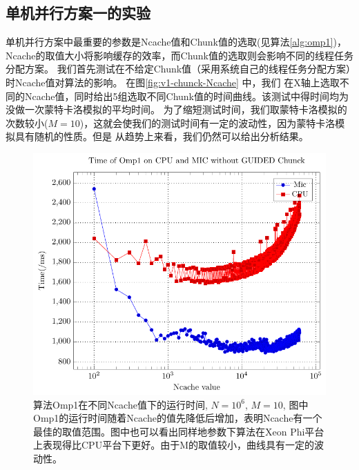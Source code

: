 \subsection{单机并行方案一的实验} %
\label{sub:bsV1}
单机并行方案中最重要的参数是Ncache值和Chunk值的选取(见算法\ref{alg:omp1})，
Ncache的取值大小将影响缓存的效率，而Chunk值的选取则会影响不同的线程任务分配方案。
我们首先测试在不给定Chunk值（采用系统自己的线程任务分配方案）时Ncache值对算法的影响。
在图\ref{fig:v1-chunck-Ncache} 中，我们
在X轴上选取不同的Ncache值，同时给出5组选取不同Chunk值的时间曲线。该测试中得时间均为没做一次蒙特卡洛模拟的平均时间。
为了缩短测试时间，我们取蒙特卡洛模拟的次数较小($M=10$)，这就会使我们的测试时间有一定的波动性，因为蒙特卡洛模拟具有随机的性质。但是
从趋势上来看，我们仍然可以给出分析结果。
\begin{figure}[!t]
   \centering
   \includegraphics[width=\textwidth]{chap5/Figures/bsV1-6-mic-cpu-Time-Chunck-0.pdf}
   \caption{算法Omp1在不同Ncache值下的运行时间, $N=10^6$, $M=10$, 图中Omp1的运行时间随着Ncache的值先降低后增加，表明Ncache有一个
   最佳的取值范围。图中也可以看出同样地参数下算法在Xeon Phi平台上表现得比CPU平台下更好。由于M的取值较小，曲线具有一定的波动性。}
   \label{fig:v1-Ncache}
\end{figure}

